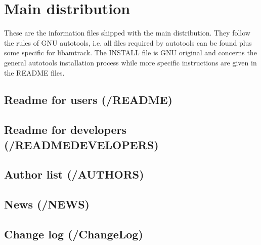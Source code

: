 \section{Main distribution}

These are the information files shipped with the main distribution. They follow the rules of GNU autotools, i.e. all files required by autotools can be found plus some specific for libamtrack. The INSTALL file is GNU original and concerns the general autotools installation process while more specific instructions are given in the README files.


\subsection{Readme for users (/README)}

\lstset{fancyvrb=true,breaklines}


\newpage
\subsection{Readme for developers (/README\textunderscore DEVELOPERS)}

\lstset{fancyvrb=true,breaklines}


\newpage
\subsection{Author list (/AUTHORS)}

\lstset{fancyvrb=true,breaklines}


\newpage
\subsection{News (/NEWS)}

\lstset{fancyvrb=true,breaklines}


\newpage
\subsection{Change log (/ChangeLog)}

\lstset{fancyvrb=true,breaklines}


